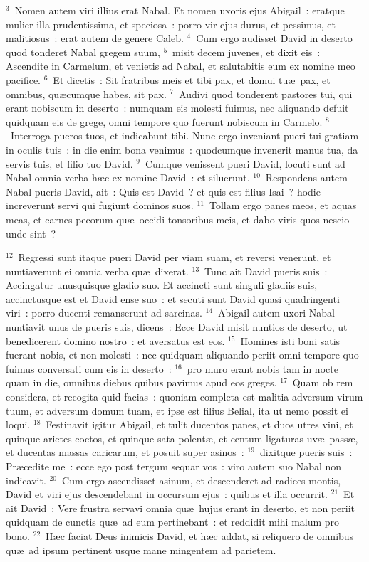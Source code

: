 ${}^{3}$~Nomen autem viri illius erat Nabal. Et nomen uxoris ejus Abigail~: eratque mulier illa prudentissima, et speciosa~: porro vir ejus durus, et pessimus, et malitiosus~: erat autem de genere Caleb.
${}^{4}$~Cum ergo audisset David in deserto quod tonderet Nabal gregem suum,
${}^{5}$~misit decem juvenes, et dixit eis~: Ascendite in Carmelum, et venietis ad Nabal, et salutabitis eum ex nomine meo pacifice.
${}^{6}$~Et dicetis~: Sit fratribus meis et tibi pax, et domui tu\ae\ pax, et omnibus, qu\ae cumque habes, sit pax.
${}^{7}$~Audivi quod tonderent pastores tui, qui erant nobiscum in deserto~: numquam eis molesti fuimus, nec aliquando defuit quidquam eis de grege, omni tempore quo fuerunt nobiscum in Carmelo.
${}^{8}$~Interroga pueros tuos, et indicabunt tibi. Nunc ergo inveniant pueri tui gratiam in oculis tuis~: in die enim bona venimus~: quodcumque invenerit manus tua, da servis tuis, et filio tuo David.
${}^{9}$~Cumque venissent pueri David, locuti sunt ad Nabal omnia verba h\ae c ex nomine David~: et siluerunt.
${}^{10}$~Respondens autem Nabal pueris David, ait~: Quis est David~? et quis est filius Isai~? hodie increverunt servi qui fugiunt dominos suos.
${}^{11}$~Tollam ergo panes meos, et aquas meas, et carnes pecorum qu\ae\ occidi tonsoribus meis, et dabo viris quos nescio unde sint~?


${}^{12}$~Regressi sunt itaque pueri David per viam suam, et reversi venerunt, et nuntiaverunt ei omnia verba qu\ae\ dixerat.
${}^{13}$~Tunc ait David pueris suis~: Accingatur unusquisque gladio suo. Et accincti sunt singuli gladiis suis, accinctusque est et David ense suo~: et secuti sunt David quasi quadringenti viri~: porro ducenti remanserunt ad sarcinas.
${}^{14}$~Abigail autem uxori Nabal nuntiavit unus de pueris suis, dicens~: Ecce David misit nuntios de deserto, ut benedicerent domino nostro~: et aversatus est eos.
${}^{15}$~Homines isti boni satis fuerant nobis, et non molesti~: nec quidquam aliquando periit omni tempore quo fuimus conversati cum eis in deserto~:
${}^{16}$~pro muro erant nobis tam in nocte quam in die, omnibus diebus quibus pavimus apud eos greges.
${}^{17}$~Quam ob rem considera, et recogita quid facias~: quoniam completa est malitia adversum virum tuum, et adversum domum tuam, et ipse est filius Belial, ita ut nemo possit ei loqui.
${}^{18}$~Festinavit igitur Abigail, et tulit ducentos panes, et duos utres vini, et quinque arietes coctos, et quinque sata polent\ae , et centum ligaturas uv\ae\ pass\ae , et ducentas massas caricarum, et posuit super asinos~:
${}^{19}$~dixitque pueris suis~: Pr\ae cedite me~: ecce ego post tergum sequar vos~: viro autem suo Nabal non indicavit.
${}^{20}$~Cum ergo ascendisset asinum, et descenderet ad radices montis, David et viri ejus descendebant in occursum ejus~: quibus et illa occurrit.
${}^{21}$~Et ait David~: Vere frustra servavi omnia qu\ae\ hujus erant in deserto, et non periit quidquam de cunctis qu\ae\ ad eum pertinebant~: et reddidit mihi malum pro bono.
${}^{22}$~H\ae c faciat Deus inimicis David, et h\ae c addat, si reliquero de omnibus qu\ae\ ad ipsum pertinent usque mane mingentem ad parietem.


